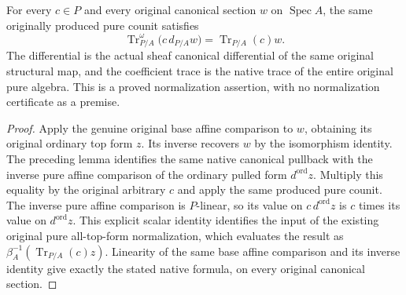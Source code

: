 \begin{theorem}
\label{thm:kn-global-trace-native-pure-counit-normalization}
\leanok
For every $c\in P$ and every original canonical section $w$ on
$\operatorname{Spec}A$, the same originally produced pure counit satisfies
\[
 \operatorname{Tr}^{\omega}_{P/A}\bigl(c\,d_{P/A}w\bigr)
       =\operatorname{Tr}_{P/A}(c)w.
\]
The differential is the actual sheaf canonical differential of the
same original structural map, and the coefficient trace is the native
trace of the entire original pure algebra.  This is a proved
normalization assertion, with no normalization certificate as a premise.
\end{theorem}
\begin{proof}
Apply the genuine original base affine comparison to $w$, obtaining
its original ordinary top form $z$.  Its inverse recovers $w$ by the
isomorphism identity.  The preceding lemma identifies the same native
canonical pullback with the inverse pure affine comparison of the
ordinary pulled form $d^{\mathrm{ord}}z$.  Multiply this equality by the
original arbitrary $c$ and apply the same produced pure counit.
The inverse pure affine comparison is $P$-linear, so its value on
$c\,d^{\mathrm{ord}}z$ is $c$ times its value on $d^{\mathrm{ord}}z$.
This explicit scalar identity identifies the input of the existing
original pure all-top-form normalization, which evaluates the result
as $\beta_A^{-1}(\operatorname{Tr}_{P/A}(c)z)$.  Linearity of the same
base affine comparison and its inverse identity give exactly the stated
native formula, on every original canonical section.
\end{proof}
